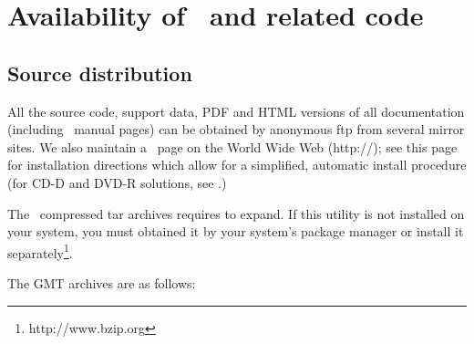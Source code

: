 %
%
\chapter{Availability of \gmt\ and related code}
\label{app:D}
\thispagestyle{headings}

\section{Source distribution}
All the source code, support data, PDF
and HTML versions of all documentation (including \UNIX\
manual pages) can be obtained by anonymous
ftp from several mirror sites.  We also maintain a \GMT\
page on the World Wide Web (http://\GMTSITE);
see this page for installation directions 
which allow for a simplified, automatic install procedure
(for CD-D and DVD-R solutions, see .)

The \GMT\ compressed tar archives requires \progname{bzip2} to expand.  If this utility
is not installed on your system, you must obtained it by your system's package manager
or install it separately\footnote{http://www.bzip.org}.

The GMT archives are as follows:

